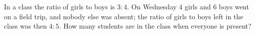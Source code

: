 In a class the ratio of girls to boys is $3:4$. On Wednesday $4$ girls and $6$ boys went on a field trip, and nobody else was absent; the ratio of girls to boys left in the class was then $4:5$. How many students are in the class when everyone is present?
